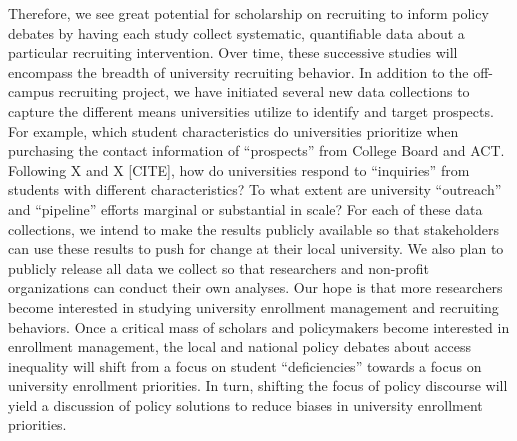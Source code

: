 \documentclass[twoside]{article}
\begin{document}
Therefore, we see great potential for scholarship on recruiting to inform policy debates by having each study collect systematic, quantifiable data about a particular recruiting intervention. Over time, these successive studies will encompass the breadth of university recruiting behavior.  In addition to the off-campus recruiting project, we have initiated several new data collections to capture the different means universities utilize to identify and target prospects.  For example, which student characteristics do universities prioritize when purchasing the contact information of ``prospects'' from College Board and ACT.  Following X and X [CITE], how do universities respond to ``inquiries'' from students with different characteristics? To what extent are university ``outreach'' and ``pipeline'' efforts marginal or substantial in scale? For each of these data collections, we intend to make the results publicly available so that stakeholders can use these results to push for change at their local university. We also plan to publicly release all data we collect so that researchers and non-profit organizations can conduct their own analyses.  Our hope is that more researchers become interested in studying university enrollment management and recruiting behaviors.  Once a critical mass of scholars and policymakers become interested in enrollment management, the local and national policy debates about access inequality will shift from a focus on student ``deficiencies'' towards a focus on university enrollment priorities.  In turn, shifting the focus of policy discourse will yield a discussion of policy solutions to reduce biases in university enrollment priorities.


\newpage


\def\bibfont{\small}




\newpage
\pagecolor{LightBlue}
\begin{titlepage}
    \color{LightBlue}{x}
\end{titlepage}
\end{document}
